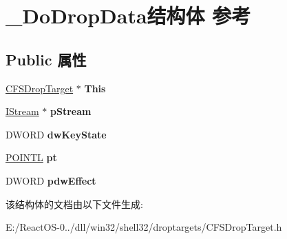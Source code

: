 \hypertarget{struct___do_drop_data}{}\section{\+\_\+\+Do\+Drop\+Data结构体 参考}
\label{struct___do_drop_data}
\subsection*{Public 属性}
\begin{DoxyCompactItemize}
\item 
\mbox{\label{struct___do_drop_data_afe8386d879355609ef076a4544f0078c}} 
\hyperlink{class_c_f_s_drop_target}{C\+F\+S\+Drop\+Target} $\ast$ {\bfseries This}
\item 
\mbox{\label{struct___do_drop_data_a41aea6d97b4bf6ecb39b1cc134ddc2f1}} 
\hyperlink{interface_i_stream}{I\+Stream} $\ast$ {\bfseries p\+Stream}
\item 
\mbox{\label{struct___do_drop_data_abe4c70fca3ec2aaaa3aa1022f87a9341}} 
D\+W\+O\+RD {\bfseries dw\+Key\+State}
\item 
\mbox{\label{struct___do_drop_data_a1b1570def8f2ec782bc32d73b6d29561}} 
\hyperlink{struct___p_o_i_n_t_l}{P\+O\+I\+N\+TL} {\bfseries pt}
\item 
\mbox{\label{struct___do_drop_data_ad6ca6ed3640240405ab633d0d287e102}} 
D\+W\+O\+RD {\bfseries pdw\+Effect}
\end{DoxyCompactItemize}


该结构体的文档由以下文件生成\+:\begin{DoxyCompactItemize}
\item 
E\+:/\+React\+O\+S-\/0../dll/win32/shell32/droptargets/C\+F\+S\+Drop\+Target.\+h\end{DoxyCompactItemize}
